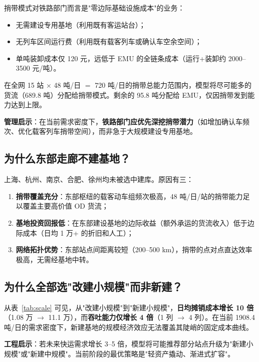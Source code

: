 \documentclass[12pt,a4paper,fontset=none]{ctexart}
\begin{document}
捎带模式对铁路部门而言是"零边际基础设施成本"的业务：
\begin{itemize}
    \item 无需建设专用基地（利用既有客运站台）；
    \item 无列车区间运行费（利用既有载客列车或确认车空余空间）；
    \item 单吨装卸成本仅 120 元，远低于 EMU 的全链条成本（运行+装卸约 2000--3500 元/吨）。
\end{itemize}

在全网 15 站 $\times$ 48 吨/日 $=$ 720 吨/日的捎带总能力范围内，模型将尽可能多的货流（689.8 吨）分配给捎带模式。剩余的 95.8 吨分配给 EMU，仅因捎带发到能力达到上限。

\textbf{管理启示}：在当前需求密度下，\textbf{铁路部门应优先深挖捎带潜力}（如增加确认车频次、优化载客列车捎带空间），而非急于大规模建设专用基地。

\subsection{为什么东部走廊不建基地？}

上海、杭州、南京、合肥、徐州均未被选中建库。原因有三：

\begin{enumerate}
    \item \textbf{捎带覆盖充分}：东部枢纽的载客动车组频次极高，48 吨/日/站的捎带能力足以覆盖主要高价值 OD 货流；
    \item \textbf{基地投资回报低}：在东部建设基地的边际收益（额外承运的货流收入）低于边际成本（日均 1 万+ 的折旧和人工）；
    \item \textbf{网络拓扑优势}：东部站点间距离较短（200--500 km），捎带的点对点直达效率极高，无需经基地中转。
\end{enumerate}

\subsection{为什么全部选"改建小规模"而非新建？}

从表~\ref{tab:scale} 可见，从"改建小规模"到"新建小规模"，\textbf{日均摊销成本增长 10 倍}（1.08 万 $\to$ 11.1 万），而\textbf{吞吐能力仅增长 4 倍}（1 列 $\to$ 4 列）。在当前 1908.4 吨/日的需求密度下，新建基地的规模经济效应无法覆盖其陡峭的固定成本曲线。

\textbf{工程启示}：若未来快运需求增长 3--5 倍，模型将可能推荐部分站点升级为"新建小规模"或"新建中规模"。当前阶段的最优策略是"轻资产撬动、渐进式扩容"。
\end{document}
